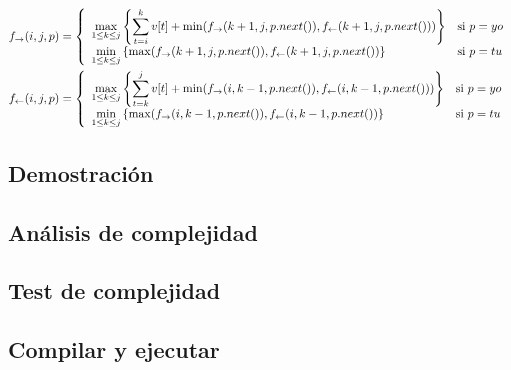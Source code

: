 \begin{align*}\hspace*{-2cm}
 f_{\rightarrow}(i,j,p) &= 
 \left\{
    \begin{array}{ll}
	\displaystyle \max_{1\leq k\leq j} \left\{ \sum_{t=i}^k v[t] + \min( f_{\rightarrow}(k+1, j, p.next()), f_{\leftarrow}(k+1,j,p.next() ))  \right\}& \mbox{si } p = yo \\
	\displaystyle \min_{1\leq k\leq j} \left\{ \max( f_{\rightarrow}(k+1, j, p.next()), f_{\leftarrow}(k+1,j,p.next() ) \right\} & \mbox{si } p = tu
    \end{array}
\right. \\
 f_{\leftarrow}(i,j,p) &= 
 \left\{
    \begin{array}{ll}
	\displaystyle \max_{1\leq k\leq j} \left\{ \sum_{t=k}^j v[t] + \min( f_{\rightarrow}(i, k-1, p.next()), f_{\leftarrow}(i, k-1,p.next() ))  \right\}& \mbox{si } p = yo \\
	\displaystyle \min_{1\leq k\leq j} \left\{ \max( f_{\rightarrow}(i, k-1, p.next()), f_{\leftarrow}(i, k-1,p.next() ) \right\} & \mbox{si } p = tu
    \end{array}
\right. \\
\end{align*}


\subsection{Demostraci\'on}

\subsection{An\'alisis de complejidad}

\subsection{Test de complejidad}

\subsection{Compilar y ejecutar}
